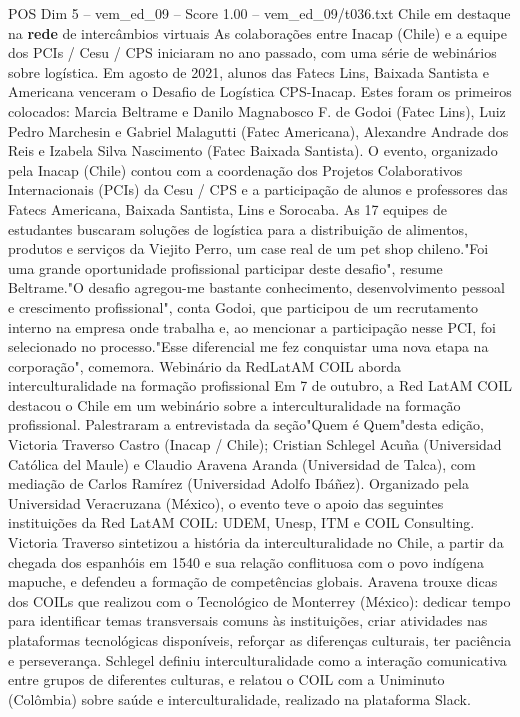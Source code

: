 \begin{textsample}{POS Dim 5 – vem\_ed\_09 – Score 1.00 – vem\_ed\_09/t036.txt}  \label{ex:f5_pos_152}
Chile em destaque na \textbf{rede} de intercâmbios virtuais As colaborações entre Inacap (Chile) e a equipe dos PCIs / Cesu / CPS iniciaram no ano passado, com uma série de webinários sobre logística.
Em agosto de 2021, alunos das Fatecs Lins, Baixada Santista e Americana venceram o Desafio de Logística CPS-Inacap.
Estes foram os primeiros colocados: Marcia Beltrame e Danilo Magnabosco F. de Godoi (Fatec Lins), Luiz Pedro Marchesin e Gabriel Malagutti (Fatec Americana), Alexandre Andrade dos Reis e Izabela Silva Nascimento (Fatec Baixada Santista).
O evento, organizado pela Inacap (Chile) contou com a coordenação dos Projetos Colaborativos Internacionais (PCIs) da Cesu / CPS e a participação de alunos e professores das Fatecs Americana, Baixada Santista, Lins e Sorocaba.
As 17 equipes de estudantes buscaram soluções de logística para a distribuição de alimentos, produtos e serviços da Viejito Perro, um case real de um pet shop chileno."Foi uma grande oportunidade profissional participar deste desafio", resume Beltrame."O desafio agregou-me bastante conhecimento, desenvolvimento pessoal e crescimento profissional", conta Godoi, que participou de um recrutamento interno na empresa onde trabalha e, ao mencionar a participação nesse PCI, foi selecionado no processo."Esse diferencial me fez conquistar uma nova etapa na corporação", comemora.
Webinário da RedLatAM COIL aborda interculturalidade na formação profissional Em 7 de outubro, a Red LatAM COIL destacou o Chile em um webinário sobre a interculturalidade na formação profissional.
Palestraram a entrevistada da seção"Quem é Quem"desta edição, Victoria Traverso Castro (Inacap / Chile); Cristian Schlegel Acuña (Universidad Católica del Maule) e Claudio Aravena Aranda (Universidad de Talca), com mediação de Carlos Ramírez (Universidad Adolfo Ibáñez).
Organizado pela Universidad Veracruzana (México), o evento teve o apoio das seguintes instituições da Red LatAM COIL: UDEM, Unesp, ITM e COIL Consulting.
Victoria Traverso sintetizou a história da interculturalidade no Chile, a partir da chegada dos espanhóis em 1540 e sua relação conflituosa com o povo indígena mapuche, e defendeu a formação de competências globais.
Aravena trouxe dicas dos COILs que realizou com o Tecnológico de Monterrey (México): dedicar tempo para identificar temas transversais comuns às instituições, criar atividades nas plataformas tecnológicas disponíveis, reforçar as diferenças culturais, ter paciência e perseverança.
Schlegel definiu interculturalidade como a interação comunicativa entre grupos de diferentes culturas, e relatou o COIL com a Uniminuto (Colômbia) sobre saúde e interculturalidade, realizado na plataforma Slack.

\end{textsample}
